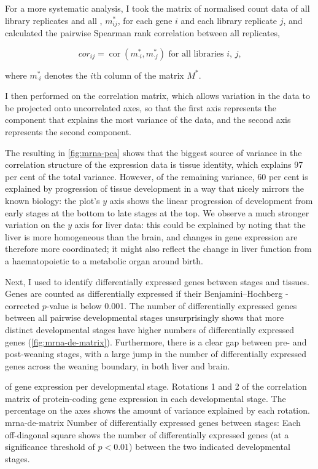 For a more systematic analysis, I took the matrix of normalised count data of
all library replicates and all \mrna[s], \(m_{ij}^*\), for each \mrna gene \(i\)
and each library replicate \(j\), and calculated the pairwise Spearman rank
correlation between all replicates,

\begin{equation}
    cor_{ij} = \operatorname{cor}(m_{\cdot i}^*, m_{\cdot j}^*) \text{\ for all
        libraries \(i\), \(j\),}
\end{equation}

where \(m_{\cdot i}^*\) denotes the \(i\)th column of the matrix \(M^*\).

I then performed \pca on the correlation matrix, which allows variation in the
data to be projected onto uncorrelated axes, so that the first axis represents
the component that explains the most variance of the data, and the second axis
represents the second component.

The resulting \pca in \cref{fig:mrna-pca} shows that the biggest source of
variance in the correlation structure of the expression data is tissue identity,
which explains \num{97} per cent of the total variance. However, of the
remaining variance, \num{60} per cent is explained by progression of tissue
development in a way that nicely mirrors the known biology: the plot’s \(y\)
axis shows the linear progression of development from early stages at the bottom
to late stages at the top. We observe a much stronger variation on the \(y\)
axis for liver data: this could be explained by noting that the liver is more
homogeneous than the brain, and changes in gene expression are therefore more
coordinated; it might also reflect the change in liver function from a
haematopoietic to a metabolic organ around birth.

Next, I used  \citep{Love:2014} to identify differentially
expressed genes between stages and tissues. Genes are counted as differentially
expressed if their Benjamini–Hochberg \fdr-corrected \(p\)-value is below
\num{0.001}. The number of differentially expressed genes between all pairwise
developmental stages unsurprisingly shows that more distinct developmental
stages have higher numbers of differentially expressed genes
(\cref{fig:mrna-de-matrix}). Furthermore, there is a clear gap between pre- and
post-weaning stages, with a large jump in the number of differentially expressed
genes across the weaning boundary, in both liver and brain.

    {\pca of \mrna gene expression per developmental stage.}
    {Rotations \num{1} and \num{2} of the correlation matrix of
    protein-coding gene expression in each developmental stage. The percentage
    on the axes shows the amount of variance explained by each rotation.}
    {mrna-de-matrix}
    {Number of differentially expressed \mrna genes between stages:}
    {Each off-diagonal square shows the number of differentially
    expressed genes (at a significance threshold of \(p<0.01\)) between
    the two indicated developmental stages.}

